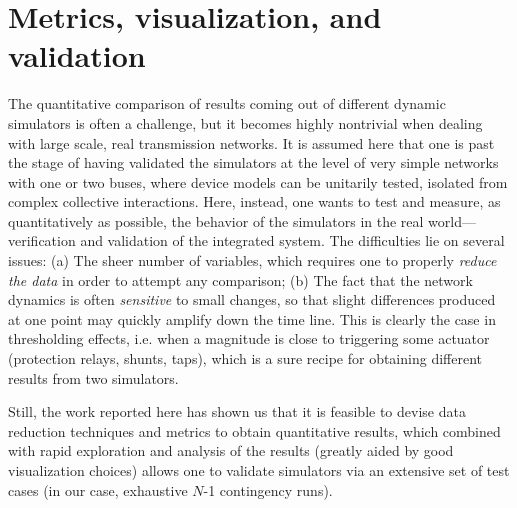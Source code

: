 \documentclass[conference]{IEEEtran}
\begin{document}
\section{Metrics, visualization, and validation}
\label{sec:metrics}

The quantitative comparison of results coming out of different dynamic
simulators is often a challenge, but it becomes highly nontrivial
when dealing with large scale, real transmission networks. It is
assumed here that one is past the stage of having validated the
simulators at the level of very simple networks with one or two buses,
where device models can be unitarily tested, isolated from complex
collective interactions. Here, instead, one wants to test and measure,
as quantitatively as possible, the behavior of the simulators in the
real world---verification and validation of the integrated system.
The difficulties lie on several issues: (a) The sheer number of
variables, which requires one to properly \emph{reduce the data} in
order to attempt any comparison; (b) The fact that the network
dynamics is often \emph{sensitive} to small changes, so that slight
differences produced at one point may quickly amplify down the time
line. This is clearly the case in thresholding effects, i.e. when a
magnitude is close to triggering some actuator (protection relays,
shunts, taps), which is a sure recipe for obtaining different results
from two simulators.

Still, the work reported here has shown us that it is feasible to
devise data reduction techniques and metrics to obtain quantitative
results, which combined with rapid exploration and analysis of
the results (greatly aided by good visualization choices) allows one to
validate simulators via an extensive set of test cases (in our case,
exhaustive $N$-1 contingency runs).
\end{document}
